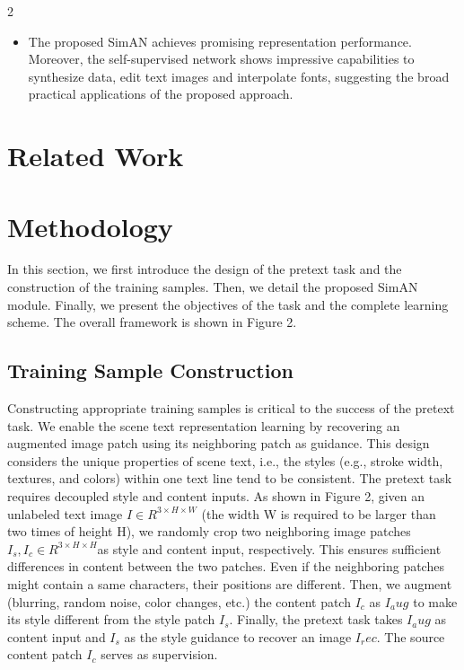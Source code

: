 \documentclass{article}
\begin{document}
\begin{multicols}{2}
\begin{itemize}
    \item The proposed SimAN achieves promising representation
performance. Moreover, the self-supervised network
shows impressive capabilities to synthesize data,
edit text images and interpolate fonts, suggesting the
broad practical applications of the proposed approach.
\end{itemize}

\section{Related Work}



\section{Methodology}
In this section, we first introduce the design of the pretext
task and the construction of the training samples. Then, we
detail the proposed SimAN module. Finally, we present the
objectives of the task and the complete learning scheme.
The overall framework is shown in Figure 2.

\subsection{Training Sample Construction}
Constructing appropriate training samples is critical to
the success of the pretext task. We enable the scene text
representation learning by recovering an augmented image
patch using its neighboring patch as guidance. This design
considers the unique properties of scene text, i.e., the styles
(e.g., stroke width, textures, and colors) within one text line
tend to be consistent.
The pretext task requires decoupled style and content inputs.
As shown in Figure 2, given an unlabeled text image
$I ∈ R^{3×H×W}$ (the width W is required to be larger than
two times of height H), we randomly crop two neighboring
image patches $I_s, I_c ∈ R^{3×H×H} $as style and content
input, respectively. This ensures sufficient differences in
content between the two patches. Even if the neighboring
patches might contain a same characters, their positions are
different. Then, we augment (blurring, random noise, color
changes, etc.) the content patch $I_c$ as $I_aug$ to make its style different from the style patch $I_s$. Finally, the pretext task
takes $I_aug$ as content input and $I_s$ as the style guidance to
recover an image $I_rec$. The source content patch $I_c$ serves
as supervision. \\


\end{multicols}
\end{document}
